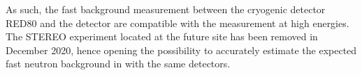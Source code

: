 As such, the fast background measurement between the cryogenic detector RED80 and the  detector are compatible with the measurement at high energies. 
The STEREO experiment located at the future \Ricochet{} site has been removed in December 2020, hence opening the possibility to accurately estimate the expected fast neutron background in \Ricochet{} with the same  detectors.








%


%
%

